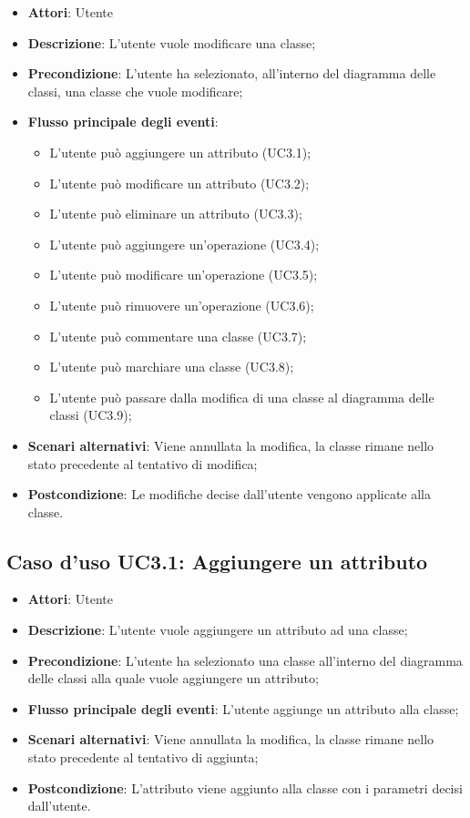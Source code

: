 \documentclass[../AnalisiDeiRequisiti.tex]{subfiles}
\begin{document}
		\begin{itemize}
			\item \textbf{Attori}: Utente
			\item \textbf{Descrizione}: L'utente vuole modificare una classe;
			\item \textbf{Precondizione}: L'utente ha selezionato, all'interno del diagramma delle classi, una classe che vuole modificare;
			\item \textbf{Flusso principale degli eventi}: \begin{itemize}
				\item L'utente può aggiungere un attributo (UC3.1);
				\item L'utente può modificare un attributo (UC3.2);
				\item L'utente può eliminare un attributo (UC3.3);
				\item L'utente può aggiungere un'operazione (UC3.4);
				\item L'utente può modificare un'operazione (UC3.5);
				\item L'utente può rimuovere un'operazione (UC3.6);
				\item L'utente può commentare una classe (UC3.7);
				\item L'utente può marchiare una classe (UC3.8);
				\item L'utente può passare dalla modifica di una classe al diagramma delle classi (UC3.9);
			\end{itemize}
			\item \textbf{Scenari alternativi}: Viene annullata la modifica, la classe rimane nello stato precedente al tentativo di modifica;
			\item \textbf{Postcondizione}: Le modifiche decise dall'utente vengono applicate alla classe.
		\end{itemize}
		\subsection{Caso d'uso UC3.1: Aggiungere un attributo}
		\begin{itemize}
			\item \textbf{Attori}: Utente
			\item \textbf{Descrizione}: L'utente vuole aggiungere un attributo ad una classe;
			\item \textbf{Precondizione}: L'utente ha selezionato una classe all'interno del diagramma delle classi alla quale vuole aggiungere un attributo;
			\item \textbf{Flusso principale degli eventi}: L'utente aggiunge un attributo alla classe;
			\item \textbf{Scenari alternativi}: Viene annullata la modifica, la classe rimane nello stato precedente al tentativo di aggiunta;
			\item \textbf{Postcondizione}: L'attributo viene aggiunto alla classe con i parametri decisi dall'utente.
		\end{itemize}
\end{document}
